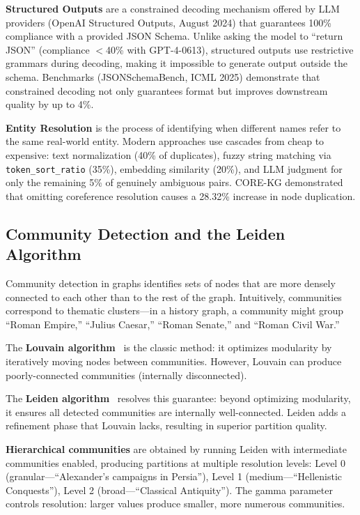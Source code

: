 \textbf{Structured Outputs} are a constrained decoding mechanism offered by LLM providers (OpenAI Structured Outputs, August 2024) that guarantees 100\% compliance with a provided JSON Schema. Unlike asking the model to ``return JSON'' (compliance $<$40\% with GPT-4-0613), structured outputs use restrictive grammars during decoding, making it impossible to generate output outside the schema. Benchmarks (JSONSchemaBench, ICML 2025) demonstrate that constrained decoding not only guarantees format but improves downstream quality by up to 4\%.

\textbf{Entity Resolution} is the process of identifying when different names refer to the same real-world entity. Modern approaches use cascades from cheap to expensive: text normalization (40\% of duplicates), fuzzy string matching via \texttt{token\_sort\_ratio} (35\%), embedding similarity (20\%), and LLM judgment for only the remaining 5\% of genuinely ambiguous pairs. CORE-KG demonstrated that omitting coreference resolution causes a 28.32\% increase in node duplication.

\subsection{Community Detection and the Leiden Algorithm}

Community detection in graphs identifies sets of nodes that are more densely connected to each other than to the rest of the graph. Intuitively, communities correspond to thematic clusters---in a history graph, a community might group ``Roman Empire,'' ``Julius Caesar,'' ``Roman Senate,'' and ``Roman Civil War.''

The \textbf{Louvain algorithm}~\cite{blondel2008louvain} is the classic method: it optimizes modularity by iteratively moving nodes between communities. However, Louvain can produce poorly-connected communities (internally disconnected).

The \textbf{Leiden algorithm}~\cite{traag2019leiden} resolves this guarantee: beyond optimizing modularity, it ensures all detected communities are internally well-connected. Leiden adds a refinement phase that Louvain lacks, resulting in superior partition quality.

\textbf{Hierarchical communities} are obtained by running Leiden with intermediate communities enabled, producing partitions at multiple resolution levels: Level 0 (granular---``Alexander's campaigns in Persia''), Level 1 (medium---``Hellenistic Conquests''), Level 2 (broad---``Classical Antiquity''). The gamma parameter controls resolution: larger values produce smaller, more numerous communities.

